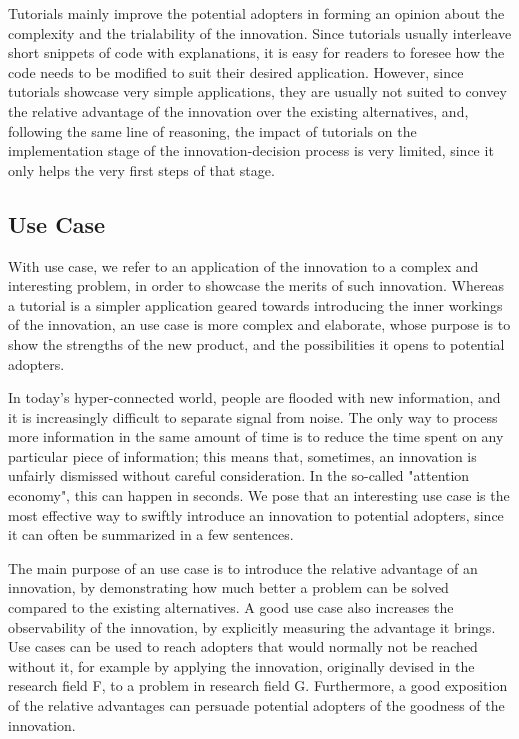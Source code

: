 \documentclass[12pt]{article}
\begin{document}
Tutorials mainly improve the potential adopters in forming an opinion about the complexity and the trialability of the innovation. Since tutorials usually interleave short snippets of code with explanations, it is easy for readers to foresee how the code needs to be modified to suit their desired application. However, since tutorials showcase very simple applications, they are usually not suited to convey the relative advantage of the innovation over the existing alternatives, and, following the same line of reasoning, the impact of tutorials on the implementation stage of the innovation-decision process is very limited, since it only helps the very first steps of that stage.

\subsection{Use Case}
\label{sec:orgcffde5b}
With use case, we refer to an application of the innovation to a complex and interesting problem, in order to showcase the merits of such innovation. Whereas a tutorial is a simpler application geared towards introducing the  inner workings of the innovation, an use case is more complex and elaborate, whose purpose is to show the strengths of the new product, and the possibilities it opens to potential adopters.

In today's hyper-connected world, people are flooded with new information, and it is increasingly difficult to separate signal from noise. The only way to process more information in the same amount of time is to reduce the time spent on any particular piece of information; this means that, sometimes, an innovation is unfairly dismissed without careful consideration. In the so-called "attention economy", this can happen in seconds. We pose that an interesting use case is the most effective way to swiftly introduce an innovation to potential adopters, since it can often be summarized in a few sentences.

The main purpose of an use case is to introduce the relative advantage of an innovation, by demonstrating how much better a problem can be solved compared to the existing alternatives. A good use case also increases the observability of the innovation, by explicitly measuring the advantage it brings. Use cases can be used to reach adopters that would normally not be reached without it, for example by applying the innovation, originally devised in the research field F, to a problem in research field G. Furthermore, a good exposition of the relative advantages can persuade potential adopters of the goodness of the innovation.
\end{document}
